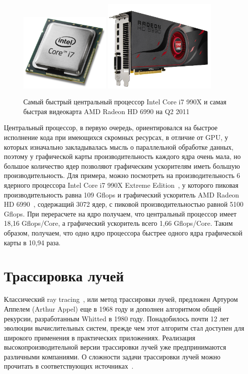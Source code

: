 \documentclass[12pt, a4paper, utf8]{article}
\begin{document}
\begin{figure}
\centering
\includegraphics[width=0.4\textwidth]{imgs/corei7.jpg}
\includegraphics[width=0.5\textwidth]{imgs/radeon6990.jpg}
\caption[Самый быстрый CPU и GPU]{Самый быстрый центральный процессор Intel Core i7 990X и самая быстрая видеокарта AMD Radeon HD 6990 на Q2 2011}\label{fig:imgs_corei7}
\end{figure}

Центральный процессор, в первую очередь, ориентировался на быстрое исполнение кода при имеющихся скромных ресурсах, в отличие от GPU, у которых изначально закладывалась мысль о параллельной обработке данных, поэтому у графической карты производительность каждого ядра очень мала, но большое количество ядер позволяют графическим ускорителям иметь большую производительность. Для примера, можно посмотреть на производительность 6 ядерного процессора Intel Core i7 990X Extreme Edition~\cite{perf_core_i7}, у которого пиковая производительность равна 109 Gflops и графический ускоритель AMD Radeon HD 6990~\cite{perf_radeon6990}, содержащий 3072 ядер, с пиковой производительностью равной 5100 Gflops. При перерасчете на ядро получаем, что центральный процессор имеет 18,16 Gflops/Core, а графический ускоритель всего 1,66 Gflops/Core. Таким образом, получаем, что одно ядро процессора быстрее одного ядра графической карты в 10,94 раза.


\newpage
\section{Трассировка лучей}
Классический ray tracing~\cite{sivakov}, или метод трассировки лучей, предложен Артуром Аппелем (Arthur Appel) еще в 1968 году и дополнен алгоритмом общей рекурсии, разработанным Whitted в 1980 году. Понадобилось почти 12 лет эволюции вычислительных систем, прежде чем этот алгоритм стал доступен для широкого применения в практических приложениях. Реализация высокопроизводительной версии трассировки лучей уже предпринимаются различными компаниями. О сложности задачи трассировки лучей можно прочитать в соответствующих источниках~\cite{biovulf}.
\end{document}
